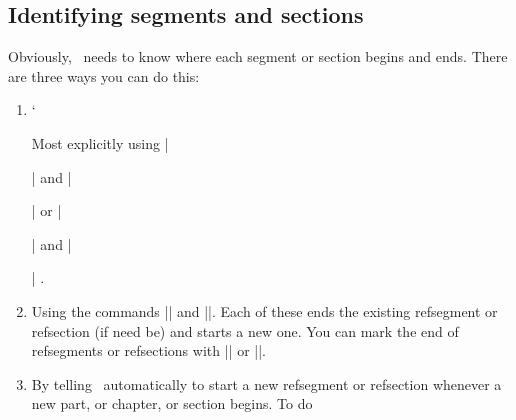 \subsection{Identifying segments and sections}

Obviously, \biblatex\ needs to know where each segment or section begins
and ends. There are three ways you can do this:

\begin{enumerate}
\item
  \begin{marginfigure}`
  \end{marginfigure}
  Most explicitly using
  |\begin{refsection}| and |\end{refsection}|
  or
  |\begin{refsegment}| and |\end{refsegment}|
.
\item
  \begin{marginfigure}
  \end{marginfigure}
  Using the commands |\newrefsection| and |\newrefsegment|. Each of
  these ends the existing refsegment or refsection (if need be) and
  starts a new one. You can mark the end of refsegments or refsections
  with |\endrefsegment| or |\endrefsection|.
\item By telling \biblatex\ automatically to start a new refsegment or
  refsection whenever a new part, or chapter, or section begins. To do

\end{enumerate}
